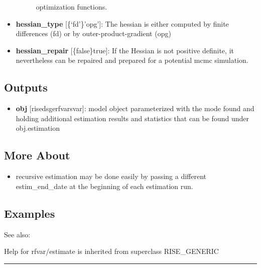 \documentclass[letterpaper,10pt,english]{sphinxmanual}
\begin{document}
\begin{itemize}
\begin{description}
\begin{itemize}
\end{itemize}

optimization functions.

\end{description}

\item {} 
\textbf{hessian\_type} {[}\{`fd'\}\textbar{}'opg'{]}: The hessian is either computed by
finite differences (fd) or by outer-product-gradient (opg)

\item {} 
\textbf{hessian\_repair} {[}\{false\}\textbar{}true{]}: If the Hessian is not positive
definite, it nevertheless can be repaired and prepared for a potential
mcmc simulation.

\end{itemize}


\subsection{Outputs}
\label{classes/models/@rfvar/rfvar:id19}\begin{itemize}
\item {} 
\textbf{obj} {[}rise\textbar{}dsge\textbar{}rfvar\textbar{}svar{]}: model object parameterized with the
mode found and holding additional estimation results and statistics
that can be found under obj.estimation

\end{itemize}


\subsection{More About}
\label{classes/models/@rfvar/rfvar:id20}\begin{itemize}
\item {} 
recursive estimation may be done easily by passing a different
estim\_end\_date at the beginning of each estimation run.

\end{itemize}


\subsection{Examples}
\label{classes/models/@rfvar/rfvar:id21}
See also:

Help for rfvar/estimate is inherited from superclass RISE\_GENERIC


\bigskip\hrule{}\bigskip
\end{document}
